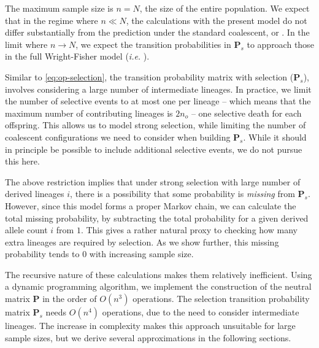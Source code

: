 \documentclass[review]{elsarticle}
\newcommand{\ra}{\rightarrow}
\begin{document}
%
%

The maximum sample size is $n=N$, the size of the entire population. We expect that in the regime
where $n\ll N$, the calculations with the present model do not differ substantially from the
prediction under the standard coalescent, or \citep{JouganousEtAl2017}. In the limit where
$n \ra N$, we expect the transition probabilities in $\mathbf{P}_s$ to approach those in the full
Wright-Fisher model (\textit{i.e.} \cite[eq. 1.58]{Ewens2004}).

Similar to \eqref{eq:op-selection}, the transition probability matrix with selection
($\mathbf{P}_s$), involves considering a large number of intermediate lineages. In practice, we
limit the number of selective events to at most one per lineage -- which means that the maximum
number of contributing lineages is $2n_o$ -- one selective death for each offspring. This allows us
to model strong selection, while limiting the number of coalescent configurations we need to
consider when building $\mathbf{P}_s$. While it should in principle be possible to include
additional selective events, we do not pursue this here.

The above restriction implies that under strong selection with large number of derived lineages $i$,
there is a possibility that some probability is \textit{missing} from $\mathbf{P}_s$. However, since
this model forms a proper Markov chain, we can calculate the total missing probability, by
subtracting the total probability for a given derived allele count $i$ from $1$. This gives a rather
natural proxy to checking how many extra lineages are required by selection. As we show further,
this missing probability tends to $0$ with increasing sample size.

The recursive nature of these calculations makes them relatively inefficient. Using a dynamic
programming algorithm, we implement the construction of the neutral matrix $\mathbf{P}$ in the order
of $O(n^3)$ operations. The selection transition probability matrix $\mathbf{P}_s$ needs $O(n^4)$
operations, due to the need to consider intermediate lineages. The increase in complexity makes this
approach unsuitable for large sample sizes, but we derive several approximations in the following
sections.
\end{document}

